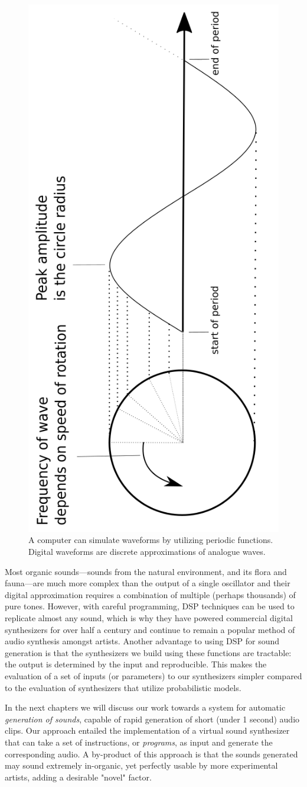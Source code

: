 \documentclass[\main/thesis.tex]{subfiles}
\begin{document}
\begin{figure}[h]
\centering
\includegraphics[width=0.45\linewidth,angle =-90 ]{images/periodic_function.png}
\caption{A computer can simulate waveforms by utilizing periodic functions. Digital waveforms are discrete approximations of analogue waves. }
\end{figure}


 Most organic sounds---sounds from the natural environment, and its flora and fauna---are much more complex than the output of a single oscillator and their digital approximation requires a combination of multiple (perhaps thousands) of pure tones. However, with careful programming, DSP techniques can be used to replicate almost any sound, which is why they have powered commercial digital synthesizers for over half a century \cite{jenkins2019analog} and continue to remain a popular method of audio synthesis amongst artists. Another advantage to using DSP for sound generation is that the synthesizers we build using these functions are tractable: the output is determined by the input and reproducible. This makes the evaluation of a set of inputs (or parameters) to our synthesizers  simpler compared to the evaluation of synthesizers that utilize probabilistic models.
 
In the next chapters we will discuss our work towards a system for automatic \textit{generation of sounds}, capable of rapid generation of short (under 1 second) audio clips. Our approach entailed the implementation of a virtual sound synthesizer that can take a set of instructions, or \textit{programs}, as input and generate the corresponding audio. A by-product of this approach is that the sounds generated may sound extremely in-organic, yet perfectly usable by more experimental artists, adding a desirable "novel" factor. 
\end{document}
